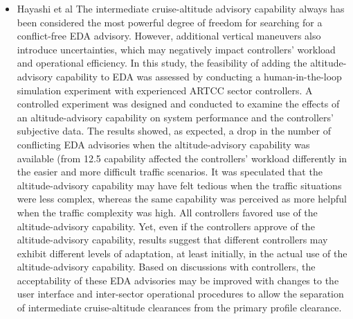 \documentclass{aer1315-pretty}
\begin{document}
\begin{itemize}
\item Hayashi et al \cite{Hayashi:2011} 
     The intermediate cruise-altitude advisory capability always has been considered the most powerful degree of
freedom for searching for a conflict-free EDA advisory. However, additional vertical maneuvers also introduce
uncertainties, which may negatively impact controllers’ workload and operational efficiency. In this study, the
feasibility of adding the altitude-advisory capability to EDA was assessed by conducting a human-in-the-loop
simulation experiment with experienced ARTCC sector controllers. A controlled experiment was designed and
conducted to examine the effects of an altitude-advisory capability on system performance and the controllers’
subjective data. The results showed, as expected, a drop in the number of conflicting EDA advisories when the
altitude-advisory capability was available (from 12.5%
capability affected the controllers’ workload differently in the easier and more difficult traffic scenarios. It was
speculated that the altitude-advisory capability may have felt tedious when the traffic situations were less complex,
whereas the same capability was perceived as more helpful when the traffic complexity was high. All controllers
favored use of the altitude-advisory capability. Yet, even if the controllers approve of the altitude-advisory
capability, results suggest that different controllers may exhibit different levels of adaptation, at least initially, in the
actual use of the altitude-advisory capability. Based on discussions with controllers, the acceptability of these EDA
advisories may be improved with changes to the user interface and inter-sector operational procedures to allow the
separation of intermediate cruise-altitude clearances from the primary profile clearance.



\end{itemize}
\end{document}
